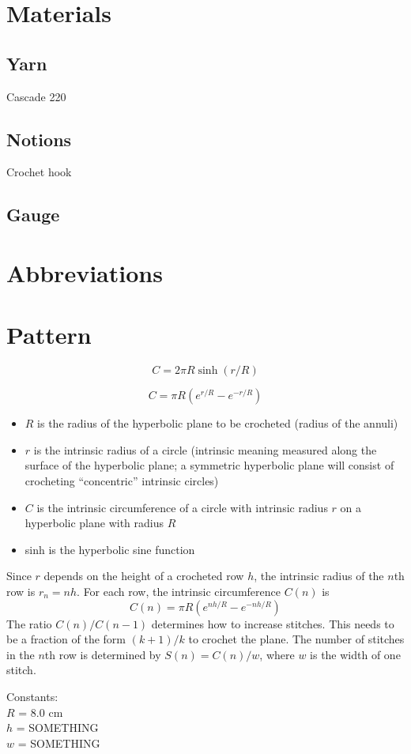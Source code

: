 \documentclass{article}
\author{BarbaraJoy Jones}
\begin{document}
\section*{Materials}
\subsection*{Yarn}
Cascade 220
\subsection*{Notions}
Crochet hook
\subsection*{Gauge}

\section*{Abbreviations}

\section*{Pattern}

\[ C = 2 \pi R \sinh (r/R) \]

\[ C = \pi R (e^{r/R} - e^{-r/R}) \]

\begin{itemize}
\item $R$ is the radius of the hyperbolic plane to be crocheted (radius of the annuli)
\item $r$ is the intrinsic radius of a circle (intrinsic meaning measured along the surface of the hyperbolic plane; a symmetric hyperbolic plane will consist of crocheting ``concentric'' intrinsic circles)
\item $C$ is the intrinsic circumference of a circle with intrinsic radius $r$ on a hyperbolic plane with radius $R$
\item sinh is the hyperbolic sine function
\end{itemize}
Since $r$ depends on the height of a crocheted row $h$, the intrinsic radius of the $n$th row is $r_n = nh$. For each row, the intrinsic circumference $C(n)$ is
\[ C(n) = \pi R (e^{nh/R} - e^{-nh/R})\]
The ratio $C(n)/C(n-1)$ determines how to increase stitches. This needs to be a fraction of the form $(k+1)/k$ to crochet the plane. The number of stitches in the $n$th row is determined by $S(n) = C(n)/w$, where $w$ is the width of one stitch.

Constants:\\
$R$ = 8.0 cm\\
$h$ = SOMETHING\\
$w$ = SOMETHING\\
\end{document}

